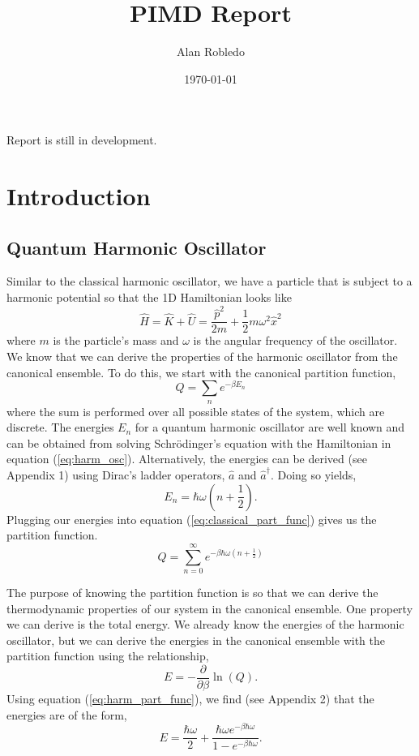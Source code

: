 \documentclass{article}
\title{PIMD Report}
\date{\today}
\author{Alan Robledo}
\newcommand{\be}{\begin{equation}}
\newcommand{\ee}{\end{equation}}
\begin{document}
\maketitle
Report is still in development.

\section{Introduction}
\subsection{Quantum Harmonic Oscillator}
Similar to the classical harmonic oscillator, we have a particle that is subject to a harmonic potential so that the 1D Hamiltonian looks like
\be \label{eq:harm_osc}
  \hat{H} = \hat{K} + \hat{U} = \frac{\hat{p}^2}{2m} + \frac{1}{2}m \omega^2\hat{x}^2
\ee
where $m$ is the particle's mass and $\omega$ is the angular frequency of the oscillator.
We know that we can derive the properties of the harmonic oscillator from the canonical ensemble. To do this, we start with the canonical partition function,
\be \label{eq:classical_part_func}
  Q = \sum_n e^{-\beta E_n}
\ee
where the sum is performed over all possible states of the system, which are discrete.\cite{tuckerman}
The energies $E_n$ for a quantum harmonic oscillator are well known and can be obtained from solving Schr\"odinger's equation with the Hamiltonian in equation (\ref{eq:harm_osc}).
Alternatively, the energies can be derived (see Appendix 1) using Dirac's ladder operators, $\hat{a}$ and $\hat{a}^{\dagger}$.\cite{griffiths,shankar}
Doing so yields,
\be
  E_n = \hbar \omega(n + \frac{1}{2}) .
\ee
Plugging our energies into equation (\ref{eq:classical_part_func}) gives us the partition function.
\be \label{eq:harm_part_func}
  Q = \sum_{n=0}^{\infty} e^{-\beta \hbar \omega(n + \frac{1}{2})}
\ee

The purpose of knowing the partition function is so that we can derive the thermodynamic properties of our system in the canonical ensemble. One property we can derive is the total energy. We already know the energies of the harmonic oscillator, but we can derive the energies in the canonical ensemble with the partition function using the relationship,
\be
  E = - \frac{\partial}{\partial \beta} \ln(Q) .
\ee
Using equation (\ref{eq:harm_part_func}), we find (see Appendix 2) that the energies are of the form,
\be \label{eq:canonical_energies}
  E = \frac{\hbar \omega}{2} + \frac{\hbar \omega e^{-\beta \hbar \omega}}{1-e^{-\beta \hbar \omega}}.
\ee
\end{document}
